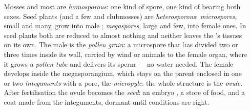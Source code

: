 \begin{definition}\label{def:b2:plant-life-cycles:heterospory}
Mosses and most  are \emph{homosporous}: one kind of spore, one
kind of  bearing both sexes. Seed plants (and a few
 and clubmosses) are \emph{heterosporous}: \emph{microspores},
small and many, grow into male ; \emph{megaspores}, large
and few, into female ones. In seed plants both are reduced to
almost nothing and neither leaves the 's tissues on its
own. The male  is the \emph{pollen grain}: a microspore
that has divided two or three times inside its wall, carried by wind
or animals to the female organ, where it grows a \emph{pollen tube}
and delivers its sperm --- no water needed. The female 
develops inside the megasporangium, which stays on the parent
enclosed in one or two \emph{integuments} with a pore, the
\emph{micropyle}: the whole structure is the \emph{ovule}. After
fertilisation the ovule becomes the \emph{seed}: an embryo
, a store of food, and a coat made from the integuments,
dormant until conditions are right.
\end{definition}

